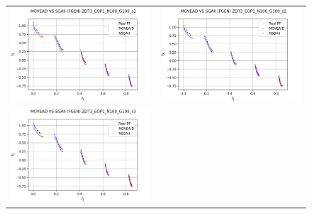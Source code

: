 \begin{figure}[H]
    \centering
    \begin{tabular}{c c}
    \includegraphics[scale=0.5]{figures/ZDT3_EOP1_N100_G100_T15/s1_comp.png} &
    \includegraphics[scale=0.5]{figures/ZDT3_EOP1_N100_G100_T15/s2_comp.png}\\
    \includegraphics[scale=0.5]{figures/ZDT3_EOP1_N100_G100_T15/s3_comp.png} &

\end{tabular}
\end{figure}
